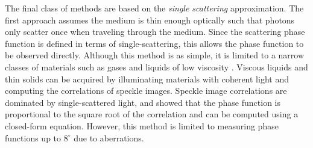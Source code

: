 The final class of methods are based on the \textit{single scattering} approximation. The first approach assumes the medium is thin enough optically such that photons only scatter once when traveling through the medium. Since the scattering phase function is defined in terms of single-scattering, this allows the phase function to be observed directly. Although this method is as simple, it is limited to a narrow classes of materials such as gases and liquids of low viscosity \cite{narasimhan2006acquiring}. Viscous liquids and thin solids can be acquired by illuminating materials with coherent light and computing the correlations of speckle images. Speckle image correlations are dominated by single-scattered light, and \cite{alterman2022direct} showed that the phase function is proportional to the square root of the correlation and can be computed using a closed-form equation. However, this method is limited to measuring phase functions up to $8^\circ$ due to aberrations.
